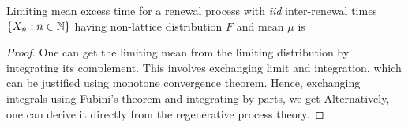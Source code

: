 \documentclass[a4paper,10pt,english]{article}
\begin{document}
\begin{cor}
Limiting mean excess time for a renewal process with \textit{iid} inter-renewal times $\{X_n: n \in \mathbb{N}\}$ having non-lattice distribution $F$ and mean $\mu$ is 
\end{cor}
\begin{proof} 
One can get the limiting mean from the limiting distribution by integrating its complement. 
This involves exchanging limit and integration, which can be justified using monotone convergence theorem. 
Hence, exchanging integrals using Fubini's theorem and integrating by parts, we get 
Alternatively, one can derive it directly from the regenerative process theory. 
\end{proof}
%
\end{document}
